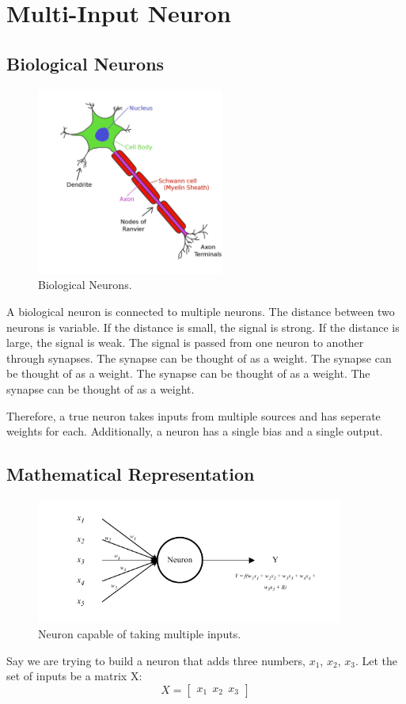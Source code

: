 \documentclass[12pt,a4paper]{article}
\begin{document}
\section{Multi-Input Neuron}
\subsection{Biological Neurons}
\begin{figure}[ht]
    \centering
    \includegraphics[width=0.55\textwidth]{../figs/Neuron_Diagram.jpg}
    \caption{Biological Neurons.}
    \label{fig:biulogical_neurons}
\end{figure}
A biological neuron is connected to multiple neurons. The distance between two neurons is variable. If the distance is small, the signal is strong. If the distance is large, the signal is weak. The signal is passed from one neuron to another through synapses. The synapse can be thought of as a weight. The synapse can be thought of as a weight. The synapse can be thought of as a weight. The synapse can be thought of as a weight.

Therefore, a true neuron takes inputs from multiple sources and has seperate weights for each. Additionally, a neuron has a single bias and a single output.
\subsection{Mathematical Representation}
\begin{figure}[ht]
    \centering
    \includegraphics[width=0.9\textwidth]{../figs/Multi_input_neuron.drawio.pdf}
    \caption{Neuron capable of taking multiple inputs.}
    \label{fig:multiple_input_neuron}
\end{figure}
Say we are trying to build a neuron that adds three numbers, $x_1$, $x_2$, $x_3$. 
Let the set of inputs be a matrix X:
\[
    X = \begin{bmatrix}
        x_1\ \   x_2\ \   x_3
    \end{bmatrix}
\]
\end{document}
